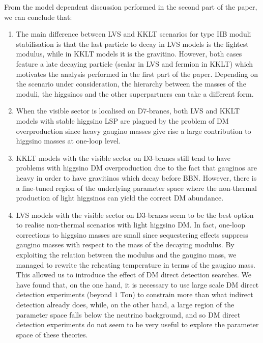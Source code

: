 \documentclass[11pt,a4paper]{article}
\begin{document}
From the model dependent discussion performed in the second part of the paper, we can conclude that:
\begin{enumerate}
\item The main difference between LVS and KKLT scenarios for type IIB moduli stabilisation is that the last particle to decay in LVS models is the lightest modulus, while in KKLT models it is the gravitino. However, both cases feature a late decaying particle (scalar in LVS and fermion in KKLT) which motivates the analysis performed in the first part of the paper. Depending on the scenario under consideration, the hierarchy between the masses of the moduli, the higgsinos and the other superpartners can take a different form. 

\item When the visible sector is localised on D7-branes, both LVS and KKLT models with stable higgsino LSP are plagued by the problem of DM overproduction since heavy gaugino masses give rise a large contribution to higgsino masses at one-loop level.

\item KKLT models with the visible sector on D3-branes still tend to have problems with higgsino DM overproduction due to the fact that gauginos are heavy in order to have gravitinos which decay before BBN. However, there is a fine-tuned region of the underlying parameter space where the non-thermal production of light higgsinos can yield the correct DM abundance. 

\item LVS models with the visible sector on D3-branes seem to be the best option to realise non-thermal scenarios with light higgsino DM. In fact, one-loop corrections to higgsino masses are small since sequestering effects suppress gaugino masses with respect to the mass of the decaying modulus. By exploiting the relation between the modulus and the gaugino mass, we managed to rewrite the reheating temperature in terms of the gaugino mass. This allowed us to introduce the effect of DM direct detection searches. We have found that, on the one hand, it is necessary to use large scale DM direct detection experiments (beyond $1$ Ton) to constrain more than what indirect detection already does, while, on the other hand, a large region of the parameter space falls below the neutrino background, and so DM direct detection experiments do not seem to be very useful to explore the parameter space of these theories.
\end{enumerate}
\end{document}
